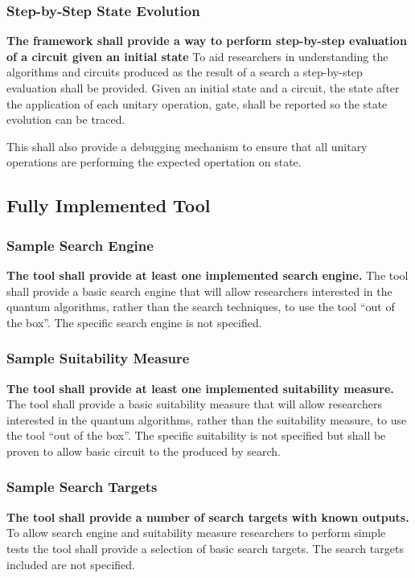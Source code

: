 \documentclass[authoryearcitations]{UoYCSproject}
\begin{document}
\subsubsection{Step-by-Step State Evolution}
\textbf{The framework shall provide a way to perform step-by-step evaluation of a circuit given an initial state}
To aid researchers in understanding the algorithms and circuits produced as the result of a search a step-by-step evaluation shall be provided.
Given an initial state and a circuit, the state after the application of each unitary operation, gate, shall be reported so the state evolution can be traced.

This shall also provide a debugging mechanism to ensure that all unitary operations are performing the expected opertation on state.

\subsection{Fully Implemented Tool}
\subsubsection{Sample Search Engine}
\textbf{The tool shall provide at least one implemented search engine.}
The tool shall provide a basic search engine that will allow researchers interested in the quantum algorithms, rather than the search techniques, to use the tool ``out of the box''.
The specific search engine is not specified.

\subsubsection{Sample Suitability Measure}
\textbf{The tool shall provide at least one implemented suitability measure.}
The tool shall provide a basic suitability measure that will allow researchers interested in the quantum algorithms, rather than the suitability measure, to use the tool ``out of the box''.
The specific suitability is not specified but shall be proven to allow basic circuit to the produced by search.

\subsubsection{Sample Search Targets}
\textbf{The tool shall provide a number of search targets with known outputs.}
To allow search engine and suitability measure researchers to perform simple tests the tool shall provide a selection of basic search targets.
The search targets included are not specified.
\end{document}
